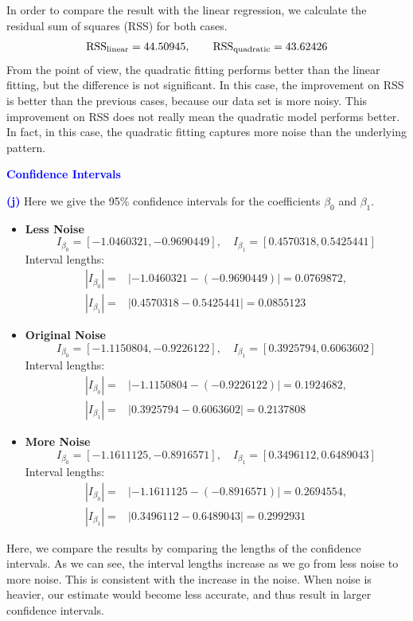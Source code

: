 \documentclass[a4paper,12pt]{article}
\newcommand{\qnum}[1]{\noindent\textcolor{blue}{\textbf{(#1)}}}
\newcommand{\tx}[1]{\text{#1}}
\newcommand{\ba}{\[\begin{aligned}}
\newcommand{\ea}{\end{aligned}\]}
\begin{document}
In order to compare the result with the linear regression, we calculate the residual sum of squares (RSS) for both cases.
\ba 
    \rss_{\tx{linear}} = 44.50945,\qquad 
    \rss_{\tx{quadratic}} = 43.62426
\ea 
From the \rss point of view, the quadratic fitting performs better than the linear fitting, but the difference is not significant. In this case, the improvement on RSS is better than the previous cases, because our data set is more noisy. This improvement on RSS does not really mean the quadratic model performs better. In fact, in this case, the quadratic fitting captures more noise than the underlying pattern. 
\bigskip\bigskip




\noindent\textcolor{blue}{\textbf{Confidence Intervals}}\bigskip 

\qnum{j}
Here we give the 95\% confidence intervals for the coefficients $\beta_0$ and $\beta_1$.

\begin{itemize}
    \item \textbf{Less Noise}
    \[
        I_{\beta_0} = [-1.0460321, -0.9690449],\quad 
        I_{\beta_1} = [0.4570318, 0.5425441]
    \]
    Interval lengths:
    \ba 
        |I_{\beta_0}| =& |-1.0460321 - (-0.9690449)| = 0.0769872,\\
        |I_{\beta_1}| =& |0.4570318- 0.5425441| = 0.0855123
    \ea 

    
    \item \textbf{Original Noise}
    \[
        I_{\beta_0} = [-1.1150804, -0.9226122],\quad 
        I_{\beta_1} = [0.3925794,  0.6063602]
    \]
    Interval lengths:
    \ba 
        |I_{\beta_0}| =& |-1.1150804 -( -0.9226122)| = 0.1924682,\\
        |I_{\beta_1}| =& |0.3925794-  0.6063602| = 0.2137808
    \ea 
    
    \item \textbf{More Noise}
    \[
        I_{\beta_0} = [-1.1611125, -0.8916571],\quad 
        I_{\beta_1} = [0.3496112, 0.6489043]
    \]
    Interval lengths:
    \ba 
        |I_{\beta_0}| =& |-1.1611125- (-0.8916571)| = 0.2694554,\\
        |I_{\beta_1}| =& |0.3496112- 0.6489043| = 0.2992931
    \ea 
\end{itemize}

Here, we compare the results by comparing the lengths of the confidence intervals. As we can see, the interval lengths increase as we go from less noise to more noise. This is consistent with the increase in the noise. When noise is heavier, our estimate would become less accurate, and thus result in larger confidence intervals.
\bigskip
\end{document}

